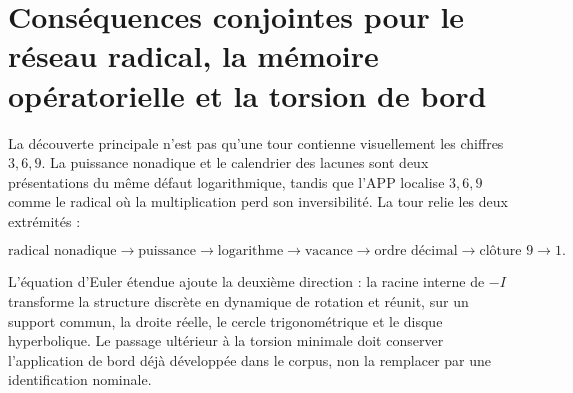 \section{Conséquences conjointes pour le réseau radical, la mémoire opératorielle et la torsion de bord}

La découverte principale n’est pas qu’une tour contienne visuellement les chiffres \(3,6,9\). La puissance nonadique et le calendrier des lacunes sont deux présentations du même défaut logarithmique, tandis que l’APP localise \(3,6,9\) comme le radical où la multiplication perd son inversibilité. La tour relie les deux extrémités :

\[
\text{radical nonadique}
\longrightarrow
\text{puissance}
\longrightarrow
\text{logarithme}
\longrightarrow
\text{vacance}
\longrightarrow
\text{ordre décimal}
\longrightarrow
\text{clôture }9\to1.
\]

L’équation d’Euler étendue ajoute la deuxième direction : la racine interne de \(-I\) transforme la structure discrète en dynamique de rotation et réunit, sur un support commun, la droite réelle, le cercle trigonométrique et le disque hyperbolique. Le passage ultérieur à la torsion minimale doit conserver l’application de bord déjà développée dans le corpus, non la remplacer par une identification nominale.
